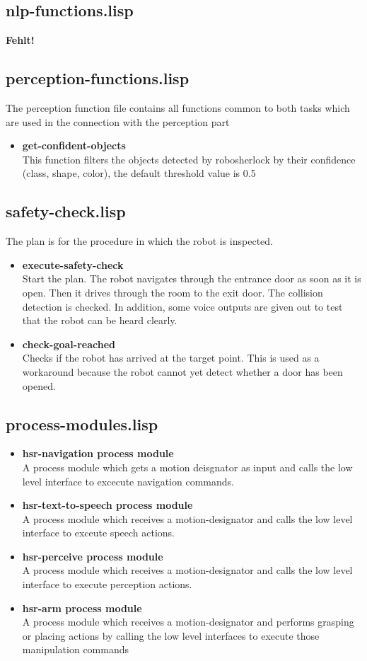 \documentclass[main.tex]{subfiles}
\begin{document}
	    \subsection{nlp-functions.lisp}
	    \textbf{Fehlt!}
	    \subsection{perception-functions.lisp}
	    The perception function file contains all functions common to both tasks which are used in the connection with the perception part
	    \begin{itemize}
	    	\item \textbf{get-confident-objects} \\
	    	This function filters the objects detected by robosherlock by their confidence (class, shape, color), the default threshold value is 0.5
	    \end{itemize}
	    \subsection{safety-check.lisp}
	    The plan is for the procedure in which the robot is inspected. 
	    \begin{itemize}
	    	\item \textbf{execute-safety-check} \\
	    	Start the plan. The robot navigates through the entrance door as soon as it is open. Then it drives through the room to the exit door. The collision detection is checked. In addition, some voice outputs are given out to test that the robot can be heard clearly.
	    	\item \textbf{check-goal-reached}\\
	    	Checks if the robot has arrived at the target point. This is used as a workaround because the robot cannot yet detect whether a door has been opened.
	    \end{itemize}
	    \subsection{process-modules.lisp}
	     \begin{itemize}
	    	\item \textbf{hsr-navigation process module} \\
		A process module which gets a motion deisgnator as input and calls the low level interface to excecute navigation commands.
		\item \textbf{hsr-text-to-speech process module} \\
		A process module which receives a motion-designator and calls the low level interface to exceute speech actions.
		\item \textbf{hsr-perceive process module} \\
		A process module which receives a motion-designator and calls the low level interface to execute perception actions.
		\item\textbf{hsr-arm process module} \\
		A process module which receives a motion-designator and performs grasping or placing actions by calling the low level interfaces to execute those manipulation commands 
	    \end{itemize}
\end{document}
